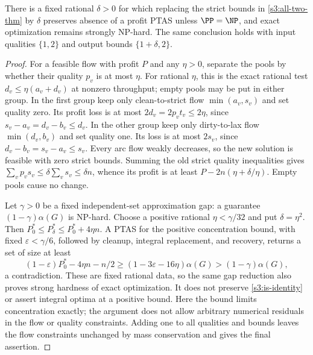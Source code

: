 \begin{proposition}\label{s3:tolerance}
There is a fixed rational $\delta>0$ for which replacing the strict
bounds in \cref{s3:all-two-thm} by $\delta$ preserves absence of a profit
PTAS unless $\PP=\NP$, and exact optimization remains strongly NP-hard.
The same conclusion holds with input qualities $\{1,2\}$ and output
bounds $\{1+\delta,2\}$.
\end{proposition}
\begin{proof}
For a feasible flow with profit $P$ and any $\eta>0$, separate the pools
by whether their quality $p_v$ is at most $\eta$. For rational $\eta$,
this is the exact rational test $d_v\le\eta(a_v+d_v)$ at nonzero
throughput; empty pools may be put in either group. In the first group keep
only clean-to-strict flow $\min(a_v,s_v)$ and set quality zero. Its profit
loss is at most $2d_v=2p_vt_v\le2\eta$, since
$s_v-a_v=d_v-b_v\le d_v$. In the other group keep only dirty-to-lax
flow $\min(d_v,b_v)$ and set quality one. Its loss is at most $2s_v$,
since $d_v-b_v=s_v-a_v\le s_v$. Every arc flow weakly decreases,
so the new solution is feasible with zero strict bounds. Summing the
old strict quality inequalities gives
$\sum_v p_vs_v\le\delta\sum_v s_v\le\delta n$, whence its profit is
at least $P-2n(\eta+\delta/\eta)$. Empty pools cause no change.

Let $\gamma>0$ be a fixed independent-set approximation gap: a guarantee
$(1-\gamma)\alpha(G)$ is NP-hard. Choose a positive rational
$\eta<\gamma/32$ and put $\delta=\eta^2$. Then
$P_0^*\le P_\delta^*\le P_0^*+4\eta n$.
A PTAS for the positive concentration bound, with fixed
$\varepsilon<\gamma/6$, followed
by cleanup, integral replacement, and recovery, returns a set of size
at least
\[
 (1-\varepsilon)P_0^*-4\eta n-n/2
 \ge(1-3\varepsilon-16\eta)\alpha(G)
 >(1-\gamma)\alpha(G),
\]
a contradiction. These are fixed rational data, so the same gap reduction
also proves strong hardness of exact optimization. It does not preserve
\eqref{s3:is-identity} or assert integral optima at a positive bound.
Here the bound limits concentration exactly; the argument does not allow
arbitrary numerical residuals in the flow or quality constraints.
Adding one to all qualities and bounds leaves the flow constraints
unchanged by mass conservation and gives the final assertion.
\end{proof}

